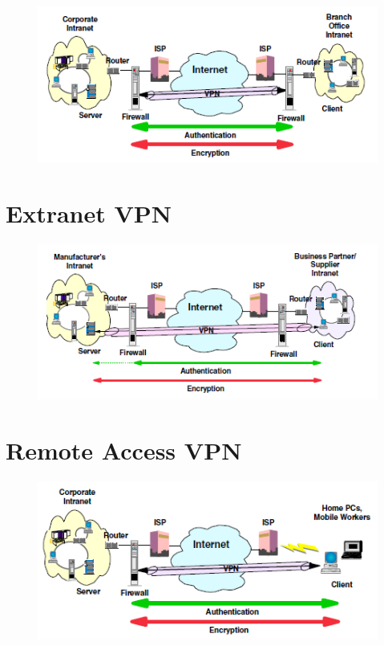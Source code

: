 \documentclass[10pt,a4paper]{article}
\begin{document}
\begin{itemize}
\begin{itemize}
\begin{itemize}
\begin{figure}[hbtp]
\centering
\includegraphics[scale=1]{Branch Office VPN.png}
\end{figure}

\newpage
\section{Extranet VPN}

\begin{figure}[hbtp]
\centering
\includegraphics[scale=1]{Extranet-VPN.png}
\end{figure}


\newpage
\section{Remote Access VPN}

\begin{figure}[hbtp]
\centering
\includegraphics[scale=1]{Remote Access VPN.png}
\end{figure}


\end{itemize}
\end{itemize}
\end{itemize}
\end{document}
